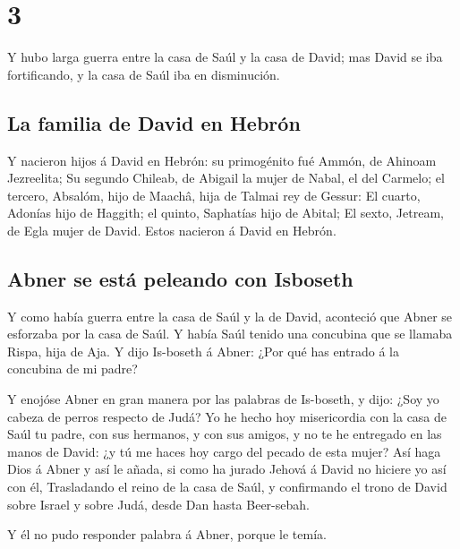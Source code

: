 \hypertarget{section-10-3}{%
\section{3}\label{section-10-3}}

 Y hubo larga guerra entre la casa de Saúl y la casa de
David; mas David se iba fortificando, y la casa de Saúl iba en
disminución.

\hypertarget{la-familia-de-david-en-hebruxf3n}{%
\subsection{La familia de David en
Hebrón}\label{la-familia-de-david-en-hebruxf3n}}

 Y nacieron hijos á David en Hebrón: su primogénito fué
Ammón, de Ahinoam Jezreelita;  Su segundo Chileab, de
Abigail la mujer de Nabal, el del Carmelo; el tercero, Absalóm, hijo de
Maachâ, hija de Talmai rey de Gessur:  El cuarto, Adonías
hijo de Haggith; el quinto, Saphatías hijo de Abital;  El
sexto, Jetream, de Egla mujer de David. Estos nacieron á David en
Hebrón.

\hypertarget{abner-se-estuxe1-peleando-con-isboseth}{%
\subsection{Abner se está peleando con
Isboseth}\label{abner-se-estuxe1-peleando-con-isboseth}}

 Y como había guerra entre la casa de Saúl y la de David,
aconteció que Abner se esforzaba por la casa de Saúl.  Y
había Saúl tenido una concubina que se llamaba Rispa, hija de Aja. Y
dijo Is-boseth á Abner: ¿Por qué has entrado á la concubina de mi padre?

 Y enojóse Abner en gran manera por las palabras de
Is-boseth, y dijo: ¿Soy yo cabeza de perros respecto de Judá? Yo he
hecho hoy misericordia con la casa de Saúl tu padre, con sus hermanos, y
con sus amigos, y no te he entregado en las manos de David: ¿y tú me
haces hoy cargo del pecado de esta mujer?  Así haga Dios á
Abner y así le añada, si como ha jurado Jehová á David no hiciere yo así
con él,  Trasladando el reino de la casa de Saúl, y
confirmando el trono de David sobre Israel y sobre Judá, desde Dan hasta
Beer-sebah.

 Y él no pudo responder palabra á Abner, porque le temía.

